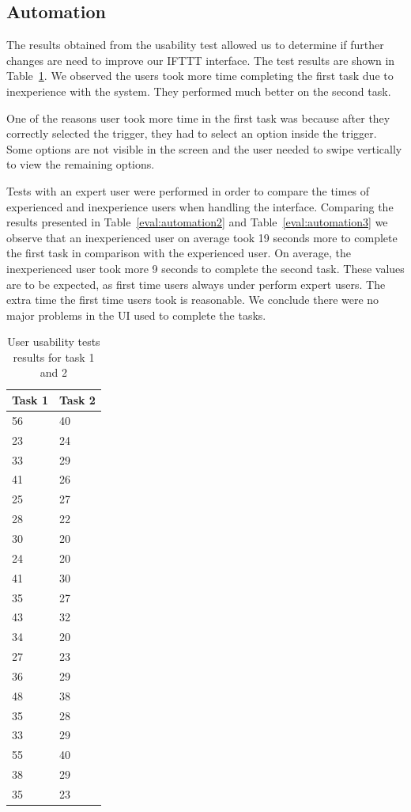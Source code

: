 \subsection{Automation}

The results obtained from the usability test allowed us to determine if further changes are need to improve our \ac{IFTTT} interface. The test results are shown in  Table~\ref{eval:automation1}. We observed the users took more time completing the first task due to inexperience with the system. They performed much better on the second task. 

One of the reasons user took more time in the first task was because after they correctly selected the trigger, they had to select an option inside the trigger. Some options are not visible in the screen and the user needed to swipe vertically to view the remaining options.

Tests with an expert user were performed in order to compare the times of experienced and inexperience users when handling the interface. Comparing the results presented in Table~\ref{eval:automation2} and Table~\ref{eval:automation3} we observe that an inexperienced user on average took 19 seconds more to complete the first task in comparison with the experienced user. On average, the inexperienced user took more 9 seconds to complete the second task. These values are to be expected, as first time users always under perform expert users. The extra time the first time users took is reasonable. We conclude there were no major problems in the \ac{UI} used to complete the tasks.

 


\begin{table}[]
\centering
\begin{tabular}{|l|l|}
\hline
Task 1 & Task 2 \\ \hline
56 & 40 \\ \hline
23 & 24 \\ \hline
33 & 29 \\ \hline
41 & 26 \\ \hline
25 & 27 \\ \hline
28 & 22 \\ \hline
30 & 20 \\ \hline
24 & 20 \\ \hline
41 & 30 \\ \hline
35 & 27 \\ \hline
43 & 32 \\ \hline
34 & 20 \\ \hline
27 & 23 \\ \hline
36 & 29 \\ \hline
48 & 38 \\ \hline
35 & 28 \\ \hline
33 & 29 \\ \hline
55 & 40 \\ \hline
38 & 29 \\ \hline
35 & 23 \\ \hline
\end{tabular}
\caption{User usability tests results for task 1 and 2}
\label{eval:automation1}
\end{table}

